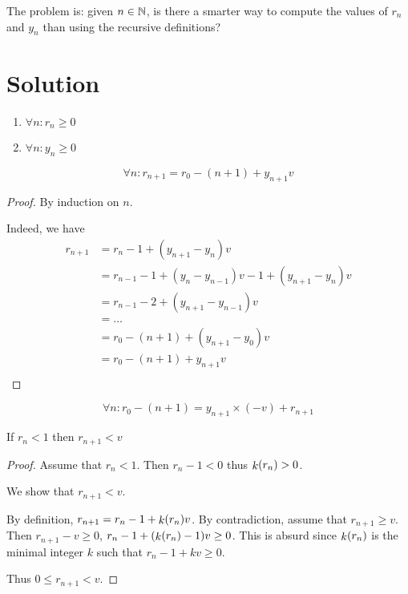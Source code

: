 The problem is: given $n \in \mathbb{N}$, is there a smarter way to compute
the values of $r_n$ and $y_n$ than using the recursive definitions?

\section{Solution}
\begin{lemma}
  \label{lem:lem1}
  \begin{enumerate}
  \item $\forall n: r_n \geq 0$
  \item $\forall n: y_n \geq 0$
  \end{enumerate}
\end{lemma}

\begin{lemma}
  \label{lem:lem2}
  $$\forall n: r_{n+1} = r_0 - (n+1) + y_{n+1} v$$
  \begin{proof}
    By induction on $n$.

    Indeed, we have
    \begin{align*}
      r_{n+1} & = r_n - 1 + (y_{n+1} - y_n) v \\
      & = r_{n-1} - 1 + (y_n - y_{n-1}) v - 1 + (y_{n+1} - y_n) v \\
      & = r_{n-1} - 2 + (y_{n+1} - y_{n-1}) v \\
      & = \ldots \\
      & = r_0 - (n+1) + (y_{n+1} - y_0) v \\
      & = r_0 - (n+1) + y_{n+1} v \\
    \end{align*}
  \end{proof}
\end{lemma}

\begin{theorem}
  \label{thm:thm1}
  $$\forall n: r_0 - (n+1) = y_{n+1} \times (- v) + r_{n+1}$$
\end{theorem}

\begin{lemma}
  \label{lem:lem3}
  If $r_n < 1$ then $r_{n+1} < v$
  \begin{proof}
    Assume that $r_n < 1$. Then $r_n - 1 < 0$ thus $\mathop{k}(r_n) > 0$.
    
    We show that $r_{n+1} < v$.
    
    By definition, $r_{n+1} = r_n - 1 + \mathop{k}(r_n) v$. By contradiction,
    assume that $r_{n+1} \geq v$. Then $r_{n+1} - v \geq 0$, \ie $r_n - 1
    + (\mathop{k}(r_n) - 1) v \geq 0$. This is absurd since $\mathop{k}(r_n)$ is
    the minimal integer $k$ such that $r_n - 1 + k v \geq 0$.
    
    Thus $0 \leq r_{n+1} < v$.
  \end{proof}
\end{lemma}    

